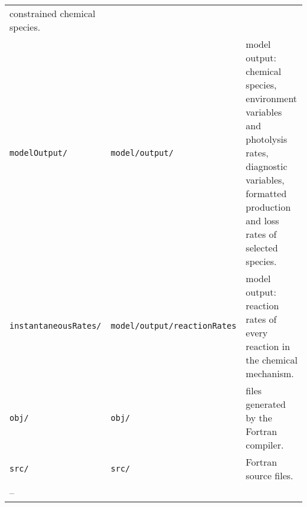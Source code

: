 \begin{longtable}[]{@{}lll@{}}
\begin{minipage}[t]{0.48\columnwidth}
constrained chemical species.\strut
\end{minipage}\tabularnewline
\begin{minipage}[t]{0.20\columnwidth}\raggedright
\texttt{modelOutput/}\strut
\end{minipage} & \begin{minipage}[t]{0.24\columnwidth}\raggedright
\texttt{model/output/}\strut
\end{minipage} & \begin{minipage}[t]{0.48\columnwidth}\raggedright
model output: chemical species, environment variables and photolysis
rates, diagnostic variables, formatted production and loss rates of
selected species.\strut
\end{minipage}\tabularnewline
\begin{minipage}[t]{0.20\columnwidth}\raggedright
\texttt{instantaneousRates/}\strut
\end{minipage} & \begin{minipage}[t]{0.24\columnwidth}\raggedright
\texttt{model/output/reactionRates}\strut
\end{minipage} & \begin{minipage}[t]{0.48\columnwidth}\raggedright
model output: reaction rates of every reaction in the chemical
mechanism.\strut
\end{minipage}\tabularnewline
\begin{minipage}[t]{0.20\columnwidth}\raggedright
\texttt{obj/}\strut
\end{minipage} & \begin{minipage}[t]{0.24\columnwidth}\raggedright
\texttt{obj/}\strut
\end{minipage} & \begin{minipage}[t]{0.48\columnwidth}\raggedright
files generated by the Fortran compiler.\strut
\end{minipage}\tabularnewline
\begin{minipage}[t]{0.20\columnwidth}\raggedright
\texttt{src/}\strut
\end{minipage} & \begin{minipage}[t]{0.24\columnwidth}\raggedright
\texttt{src/}\strut
\end{minipage} & \begin{minipage}[t]{0.48\columnwidth}\raggedright
Fortran source files.\strut
\end{minipage}\tabularnewline
\begin{minipage}[t]{0.20\columnwidth}\raggedright
--\strut
\end{minipage} & \begin{minipage}[t]{0.24\columnwidth}\raggedright

\end{minipage}
\end{longtable}
